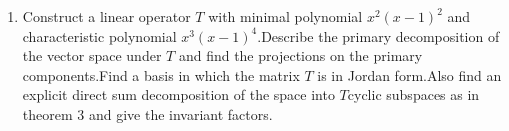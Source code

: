 \renewcommand{\theequation}{\theenumi}
\renewcommand{\thefigure}{\theenumi}
\begin{enumerate}[label=\thesubsection.\arabic*.,ref=\thesubsection.\theenumi]

\item Construct a linear operator $T$ with minimal polynomial $x^2(x-1)^2$ and characteristic polynomial $x^3(x-1)^4$.Describe the primary decomposition of the vector space under $T$ and find the projections on the primary components.Find a basis in which the matrix $T$ is in Jordan form.Also find an explicit direct sum decomposition of the space into $T$cyclic subspaces as in theorem 3 and give the invariant factors.
%
%


\end{enumerate}
